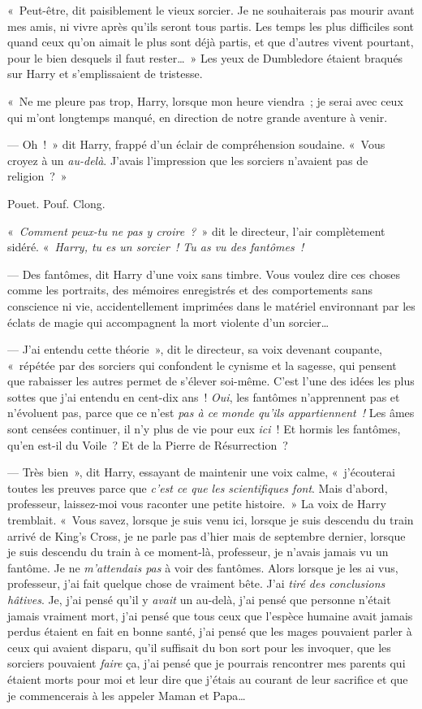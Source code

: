 «~Peut-être, dit paisiblement le vieux sorcier. Je ne souhaiterais pas mourir avant mes amis, ni vivre après qu'ils seront tous partis. Les temps les plus difficiles sont quand ceux qu'on aimait le plus sont déjà partis, et que d'autres vivent pourtant, pour le bien desquels il faut rester…~» Les yeux de Dumbledore étaient braqués sur Harry et s'emplissaient de tristesse.

«~Ne me pleure pas trop, Harry, lorsque mon heure viendra~; je serai avec ceux qui m'ont longtemps manqué, en direction de notre grande aventure à venir.

--- Oh~!~» dit Harry, frappé d'un éclair de compréhension soudaine. «~Vous croyez à un \emph{au-delà}. J'avais l'impression que les sorciers n'avaient pas de religion~?~»

\later

Pouet. Pouf. Clong.

«~\emph{Comment peux-tu ne pas y croire~?}~» dit le directeur, l'air complètement sidéré. «~\emph{Harry, tu es un sorcier~! Tu as vu des fantômes~!}

--- Des fantômes, dit Harry d'une voix sans timbre. Vous voulez dire ces choses comme les portraits, des mémoires enregistrés et des comportements sans conscience ni vie, accidentellement imprimées dans le matériel environnant par les éclats de magie qui accompagnent la mort violente d'un sorcier…

--- J'ai entendu cette théorie~», dit le directeur, sa voix devenant coupante, «~répétée par des sorciers qui confondent le cynisme et la sagesse, qui pensent que rabaisser les autres permet de s'élever soi-même. C'est l'une des idées les plus sottes que j'ai entendu en cent-dix ans~! \emph{Oui}, les fantômes n'apprennent pas et n'évoluent pas, parce que ce n'est \emph{pas à ce monde qu'ils appartiennent~!} Les âmes sont censées continuer, il n'y plus de vie pour eux \emph{ici}~! Et hormis les fantômes, qu'en est-il du Voile~? Et de la Pierre de Résurrection~?

--- Très bien~», dit Harry, essayant de maintenir une voix calme, «~j'écouterai toutes les preuves parce que \emph{c'est ce que les scientifiques font}. Mais d'abord, professeur, laissez-moi vous raconter une petite histoire.~» La voix de Harry tremblait. «~Vous savez, lorsque je suis venu ici, lorsque je suis descendu du train arrivé de King's Cross, je ne parle pas d'hier mais de septembre dernier, lorsque je suis descendu du train à ce moment-là, professeur, je n'avais jamais vu un fantôme. Je ne \emph{m'attendais pas} à voir des fantômes. Alors lorsque je les ai vus, professeur, j'ai fait quelque chose de vraiment bête. J'ai \emph{tiré des conclusions hâtives}. Je, j'ai pensé qu'il y \emph{avait} un au-delà, j'ai pensé que personne n'était jamais vraiment mort, j'ai pensé que tous ceux que l'espèce humaine avait jamais perdus étaient en fait en bonne santé, j'ai pensé que les mages pouvaient parler à ceux qui avaient disparu, qu'il suffisait du bon sort pour les invoquer, que les sorciers pouvaient \emph{faire} ça, j'ai pensé que je pourrais rencontrer mes parents qui étaient morts pour moi et leur dire que j'étais au courant de leur sacrifice et que je commencerais à les appeler Maman et Papa…

